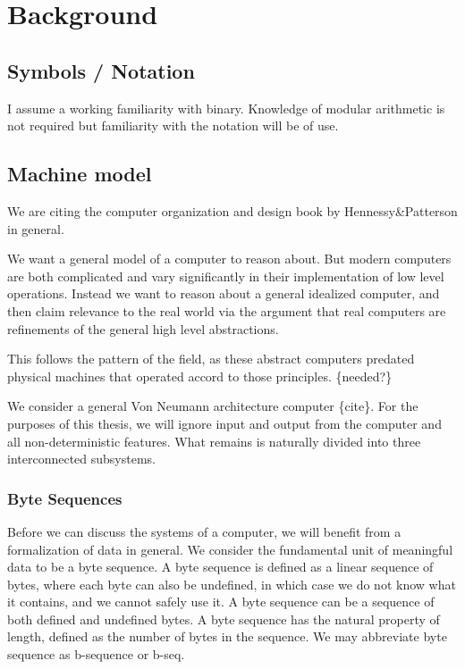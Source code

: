 \documentclass[11pt]{article}
\author{Thomas Ulmer}
\date{\today}
\title{}
\begin{document}
\tableofcontents

\section{Background}
\label{sec:org58cb969}
\subsection{Symbols / Notation}
\label{sec:org88649ea}
I assume a working familiarity with binary. Knowledge of modular
arithmetic is not required but familiarity with the notation will be
of use.
\subsection{Machine model}
\label{sec:org9e4d7bf}

We are citing the computer organization and design book by
Hennessy\&Patterson in general.

We want a general model of a computer to reason about. But modern
computers are both complicated and vary significantly in their
implementation of low level operations. Instead we want to reason
about a general idealized computer, and then claim relevance to the
real world via the argument that real computers are refinements of the
general high level abstractions.

This follows the pattern of the field, as these abstract computers
predated physical machines that operated accord to those
principles. \{needed?\}

We consider a general Von Neumann architecture computer \{cite\}. For
the purposes of this thesis, we will ignore input and output from the
computer and all non-deterministic features. What remains is naturally
divided into three interconnected subsystems.

\subsubsection{Byte Sequences}
\label{sec:org2d95e54}

Before we can discuss the systems of a computer, we will benefit from
a formalization of data in general. We consider the fundamental unit
of meaningful data to be a byte sequence. A byte sequence is defined
as a linear sequence of bytes, where each byte can also be undefined,
in which case we do not know what it contains, and we cannot safely
use it. A byte sequence can be a sequence of both defined and
undefined bytes. A byte sequence has the natural property of length,
defined as the number of bytes in the sequence. We may abbreviate byte
sequence as b-sequence or b-seq.
\end{document}
